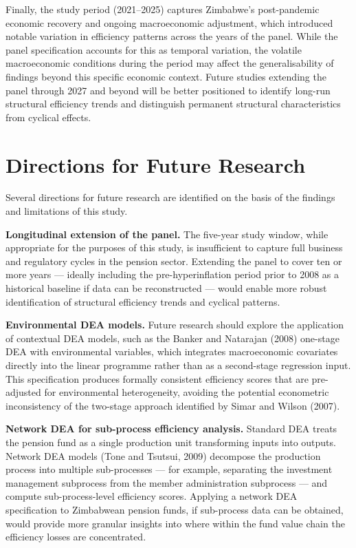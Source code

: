 \documentclass[12pt,a4paper]{article}
\begin{document}
Finally, the study period (2021--2025) captures Zimbabwe's post-pandemic economic recovery and ongoing macroeconomic adjustment, which introduced notable variation in efficiency patterns across the years of the panel. While the panel specification accounts for this as temporal variation, the volatile macroeconomic conditions during the period may affect the generalisability of findings beyond this specific economic context. Future studies extending the panel through 2027 and beyond will be better positioned to identify long-run structural efficiency trends and distinguish permanent structural characteristics from cyclical effects.

\section{Directions for Future Research}

Several directions for future research are identified on the basis of the findings and limitations of this study.

\textbf{Longitudinal extension of the panel.} The five-year study window, while appropriate for the purposes of this study, is insufficient to capture full business and regulatory cycles in the pension sector. Extending the panel to cover ten or more years --- ideally including the pre-hyperinflation period prior to 2008 as a historical baseline if data can be reconstructed --- would enable more robust identification of structural efficiency trends and cyclical patterns.

\textbf{Environmental DEA models.} Future research should explore the application of contextual DEA models, such as the Banker and Natarajan (2008) one-stage DEA with environmental variables, which integrates macroeconomic covariates directly into the linear programme rather than as a second-stage regression input. This specification produces formally consistent efficiency scores that are pre-adjusted for environmental heterogeneity, avoiding the potential econometric inconsistency of the two-stage approach identified by Simar and Wilson (2007).

\textbf{Network DEA for sub-process efficiency analysis.} Standard DEA treats the pension fund as a single production unit transforming inputs into outputs. Network DEA models (Tone and Tsutsui, 2009) decompose the production process into multiple sub-processes --- for example, separating the investment management subprocess from the member administration subprocess --- and compute sub-process-level efficiency scores. Applying a network DEA specification to Zimbabwean pension funds, if sub-process data can be obtained, would provide more granular insights into where within the fund value chain the efficiency losses are concentrated.
\end{document}
